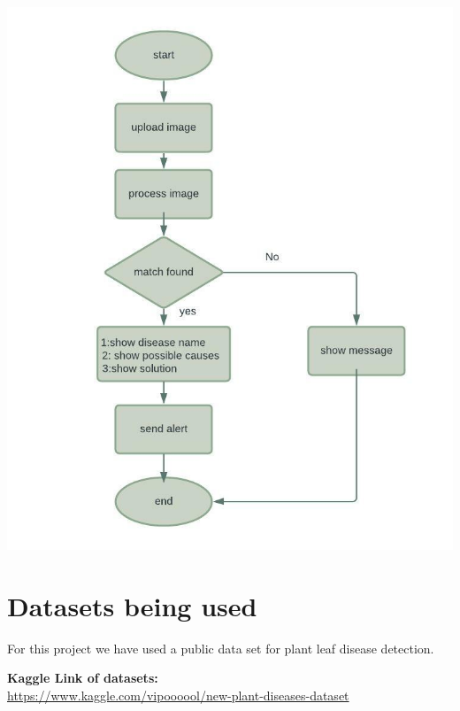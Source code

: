 \documentclass{article}
\begin{document}
\begin{center}
\includegraphics[width=15cm]{pics/drawivp (2).jpeg}
\end{center}

\section{Datasets being used}
\large{For this project we have used a public data set for plant leaf disease detection.}

\bigskip
\textbf{Kaggle Link of datasets:}\\
\large{\url{https://www.kaggle.com/vipoooool/new-plant-diseases-dataset }}
\end{document}
